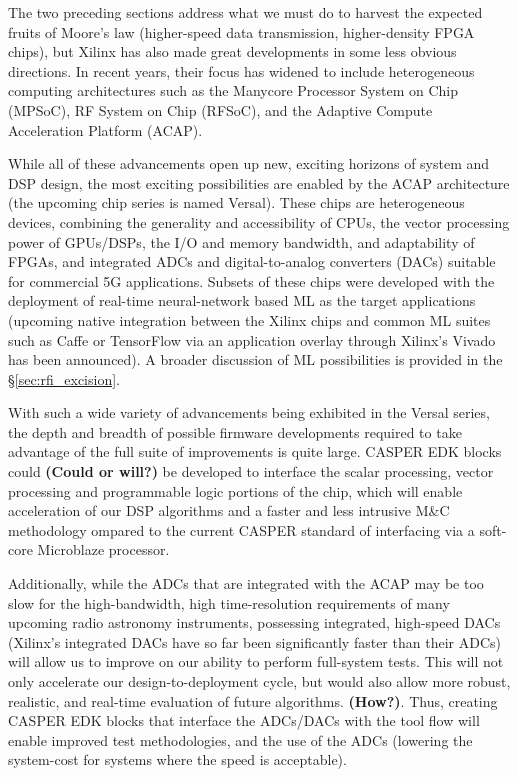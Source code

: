 \documentclass[10pt]{myNSF}
\begin{document}
 The two preceding sections
address what we must do to harvest the expected fruits of Moore's law
(higher-speed data transmission, higher-density FPGA chips), but
Xilinx has also made great developments in some less obvious
directions. In recent years, their focus has widened to include
heterogeneous computing architectures such as the Manycore Processor
System on Chip (MPSoC), RF System on Chip (RFSoC), and the Adaptive
Compute Acceleration Platform (ACAP).

While all of these advancements open up new, exciting horizons of
system and DSP design, the most exciting possibilities are enabled by
the ACAP architecture (the upcoming chip series is named
Versal). These chips are heterogeneous devices, combining the
generality and accessibility of CPUs, the vector processing power of
GPUs/DSPs, the I/O and memory bandwidth, and adaptability of FPGAs,
and integrated ADCs and digital-to-analog converters (DACs) suitable
for commercial 5G applications. Subsets of these chips were developed
with the deployment of real-time neural-network based ML as the target
applications (upcoming native integration between the Xilinx chips and
common ML suites such as Caffe or TensorFlow via an application
overlay through Xilinx’s Vivado has been announced). A broader
discussion of ML possibilities is provided in the
\S\ref{sec:rfi_excision}.

With such a wide variety of advancements being exhibited in the Versal
series, the depth and breadth of possible firmware developments
required to take advantage of the full suite of improvements is quite
large. CASPER EDK blocks could \textbf{(Could or will?)} be developed
to interface the scalar processing, vector processing and programmable
logic portions of the chip, which will enable acceleration of our DSP
algorithms and a faster and less intrusive M\&C methodology ompared to
the current CASPER standard of interfacing via a soft-core Microblaze
processor.

Additionally, while the ADCs that are integrated with the ACAP may be
too slow for the high-bandwidth, high time-resolution requirements of
many upcoming radio astronomy instruments, possessing integrated,
high-speed DACs (Xilinx’s integrated DACs have so far been
significantly faster than their ADCs) will allow us to improve on our
ability to perform full-system tests.  This will not only accelerate
our design-to-deployment cycle, but would also allow more robust,
realistic, and real-time evaluation of future algorithms.
\textbf{(How?)}.  Thus, creating CASPER EDK blocks that interface the
ADCs/DACs with the tool flow will enable improved test methodologies,
and the use of the ADCs (lowering the system-cost for systems where
the speed is acceptable).
\end{document}
